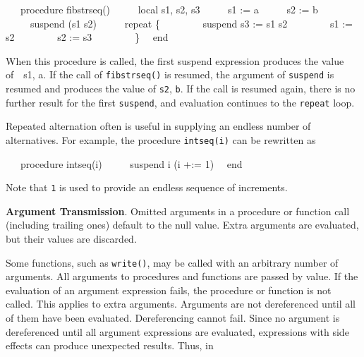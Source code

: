 \ \ \ procedure fibstrseq()\newline
 \ \ \ \ \ local s1, s2, s3\newline
 \ \ \ \ \ s1 := {\textquotedbl}a{\textquotedbl}\newline
 \ \ \ \ \ s2 := {\textquotedbl}b{\textquotedbl}\newline
 \ \ \ \ \ suspend (s1 {\textbar} s2)\newline
 \ \ \ \ \ repeat \{\newline
 \ \ \ \ \ \ \ \ suspend s3 := s1 {\textbar}{\textbar} s2\newline
 \ \ \ \ \ \ \ \ s1 := s2\newline
 \ \ \ \ \ \ \ \ s2 := s3\newline
 \ \ \ \ \ \ \ \ \}\newline
 \ \ end

When this procedure is called, the first suspend expression produces
the value of\ \ s1, {\textquotedbl}a{\textquotedbl}. If the call of
\texttt{fibstrseq()} is resumed, the argument of \texttt{suspend} is
resumed and produces the value of \texttt{s2},
\texttt{{\textquotedbl}b{\textquotedbl}}. If the call is resumed
again, there is no further result for the first \texttt{suspend}, and
evaluation continues to the \texttt{repeat} loop.

Repeated alternation often is useful in supplying an endless number of
alternatives. For example, the procedure \texttt{intseq(i)} can be
rewritten as

{\ttfamily\mdseries
\ \ \ procedure intseq(i)\newline
 \ \ \ \ \ suspend i {\textbar} (i +:= {\textbar}1)\newline
 \ \ end}

Note that \texttt{{\textbar}1} is used to provide an endless sequence
of increments.


\textbf{Argument Transmission}. Omitted arguments in a procedure or
function call (including trailing ones) default to the null
value. Extra arguments are evaluated, but their values are discarded.

Some functions, such as \texttt{write()}, may be called with an
arbitrary number of arguments. All arguments to procedures and
functions are passed by value. If the evaluation of an argument
expression fails, the procedure or function is not called. This
applies to extra arguments. Arguments are not dereferenced until all
of them have been evaluated. Dereferencing cannot fail. Since no
argument is dereferenced until all argument expressions are evaluated,
expressions with side effects can produce unexpected results. Thus, in

